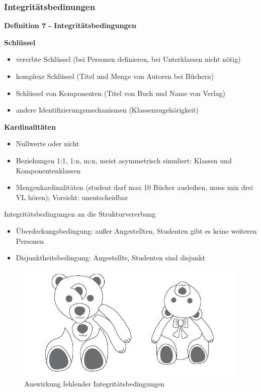 \subsubsection{Integritätsbedinungen}
\begin{framed}
	\textbf{Definition 7 - Integritätsbedingungen}
	\begin{description}
		\item \textbf{Schlüssel}
		\begin{itemize}
			\item vererbte Schlüssel (bei Personen definieren, bei Unterklassen nicht nötig)
			\item komplexe Schlüssel (Titel und Menge von Autoren bei Büchern)
			\item Schlüssel von Komponenten (Titel von Buch und Name von Verlag)
			\item andere Identifizierungsmechanismen (Klassenzugehörigkeit)
		\end{itemize}
		
		\item \textbf{Kardinalitäten}
		\begin{itemize}
			\item Nullwerte oder nicht
			\item Beziehungen 1:1, 1:n, m:n, meist asymmetrisch simuliert: Klassen und Komponentenklassen 
			\item Mengenkardinalitäten (student darf max 10 Bücher ausleihen, muss min drei VL hören); Vorsicht: unentscheidbar
		\end{itemize}
		
		\item Integritätsbedingungen an die Strukturvererbung
		\begin{itemize}
			\item Überdeckungsbedingung: außer Angestellten, Studenten gibt es keine weiteren Personen
			\item Disjunktheitsbedingung: Angestellte, Studenten sind disjunkt
		\end{itemize}
	\end{description}
\end{framed}

\begin{figure}[!h]
	\centering
	\includegraphics[scale=0.5]{img/struc_6.png}
	\caption{Auswirkung fehlender Integritätsbedingungen}
\end{figure}


